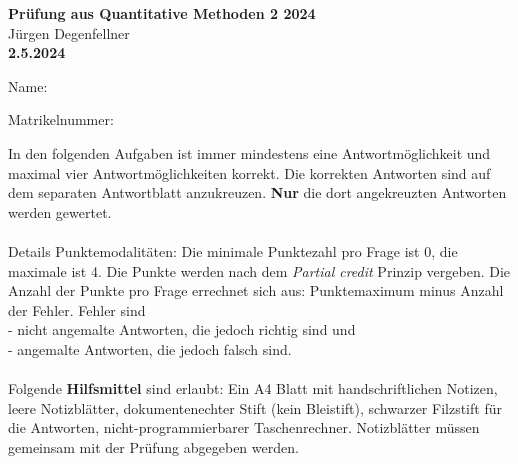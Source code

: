 \documentclass[10pt,addpoints]{exam}
\begin{document}
\begin{center}
\textbf{\Huge Prüfung aus Quantitative Methoden 2 2024} \\
\vspace{0.5cm}
Jürgen Degenfellner\\
\vspace{0.5cm}
\textbf{\large 2.5.2024}
\end{center}
\vspace{1cm}

\noindent Name:  \\
    
\vspace{5mm} %

\noindent Matrikelnummer: 

\vspace{10mm}

\noindent In den folgenden Aufgaben ist immer mindestens eine Antwortmöglichkeit und maximal vier Antwortmöglichkeiten korrekt. Die korrekten Antworten sind auf dem separaten Antwortblatt anzukreuzen. \textbf{Nur} die dort angekreuzten Antworten werden gewertet. \\
\\
Details Punktemodalitäten: Die minimale Punktezahl pro Frage ist 0, die maximale ist 4. Die Punkte werden nach dem \textit{Partial credit} Prinzip vergeben. Die Anzahl der Punkte pro Frage errechnet sich aus: Punktemaximum minus Anzahl der Fehler. Fehler sind \\
 - nicht angemalte Antworten, die jedoch richtig sind und \\
 - angemalte Antworten, die jedoch falsch sind. \\
\\
Folgende \textbf{Hilfsmittel} sind erlaubt: Ein A4 Blatt mit handschriftlichen Notizen, leere Notizblätter, dokumentenechter Stift (kein Bleistift), schwarzer Filzstift für die Antworten, nicht-programmierbarer Taschenrechner. Notizblätter müssen gemeinsam mit der Prüfung abgegeben werden. 
\vspace{1cm}
\end{document}

